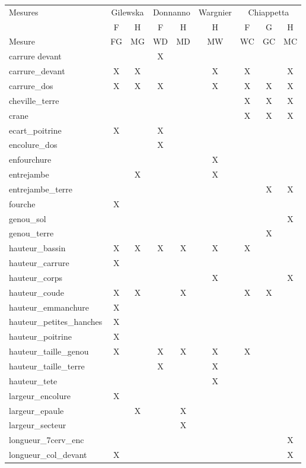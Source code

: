 \documentclass[10pt,a4paper,twoside]{report}
\begin{document}
\begin{table}
\begin{center}
\begin{tabular}{lcccccccc} \hline
Mesures & \multicolumn{2}{c}{Gilewska} & \multicolumn{2}{c}{Donnanno} & Wargnier & \multicolumn{3}{c}{Chiappetta}\\
& F & H & F & H & H & F & G & H\\  \hline
Mesure& FG & MG & WD & MD & MW & WC & GC & MC\\
carrure devant&&&X&&&&&\\ \hline
carrure\_devant&X&X&&&X&X&&X\\ \hline
carrure\_dos&X&X&X&&X&X&X&X\\ \hline
cheville\_terre&&&&&&X&X&X\\ \hline
crane&&&&&&X&X&X\\ \hline
ecart\_poitrine&X&&X&&&&&\\ \hline
encolure\_dos&&&X&&&&&\\ \hline
enfourchure&&&&&X&&&\\ \hline
entrejambe&&X&&&X&&&\\ \hline
entrejambe\_terre&&&&&&&X&X\\ \hline
fourche&X&&&&&&&\\ \hline
genou\_sol&&&&&&&&X\\ \hline
genou\_terre&&&&&&&X&\\ \hline
hauteur\_bassin&X&X&X&X&X&X&&\\ \hline
hauteur\_carrure&X&&&&&&&\\ \hline
hauteur\_corps&&&&&X&&&X\\ \hline
hauteur\_coude&X&X&&X&&X&X&\\ \hline
hauteur\_emmanchure&X&&&&&&&\\ \hline
hauteur\_petites\_hanches&X&&&&&&&\\ \hline
hauteur\_poitrine&X&&&&&&&\\ \hline
hauteur\_taille\_genou&X&&X&X&X&X&&\\ \hline
hauteur\_taille\_terre&&&X&&X&&&\\ \hline
hauteur\_tete&&&&&X&&&\\ \hline
largeur\_encolure&X&&&&&&&\\ \hline
largeur\_epaule&&X&&X&&&&\\ \hline
largeur\_secteur&&&&X&&&&\\ \hline
longueur\_7cerv\_enc&&&&&&&&X\\ \hline
longueur\_col\_devant&X&&&&&&&X\\ \hline

\end{tabular}
\end{center}
\end{table}
\end{document}
